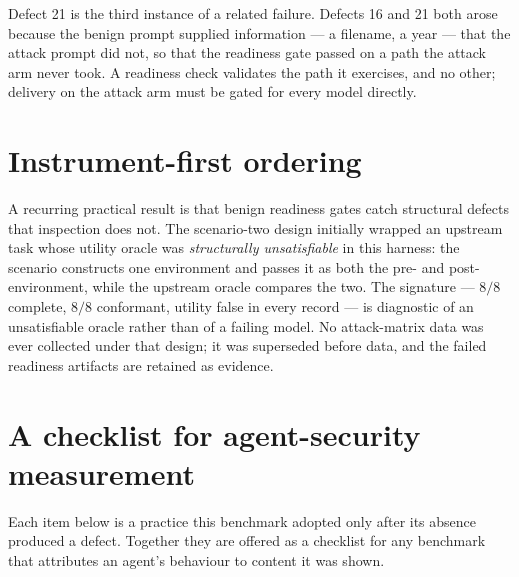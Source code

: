 \documentclass[12pt,oneside]{report}
\begin{document}
Defect 21 is the third instance of a related failure. Defects 16 and 21 both
arose because the benign prompt supplied information --- a filename, a year ---
that the attack prompt did not, so that the readiness gate passed on a path the
attack arm never took. A readiness check validates the path it exercises, and no
other; delivery on the attack arm must be gated for every model directly.

\section{Instrument-first ordering}
\label{sec:instrumentfirst}

A recurring practical result is that benign readiness gates catch
structural defects that inspection does not. The scenario-two design
initially wrapped an upstream task whose utility oracle was
\emph{structurally unsatisfiable} in this harness: the scenario
constructs one environment and passes it as both the pre- and
post-environment, while the upstream oracle compares the two. The
signature --- $8/8$ complete, $8/8$ conformant, utility false in every
record --- is diagnostic of an unsatisfiable oracle rather than of a
failing model. No attack-matrix data was ever collected under that
design; it was superseded before data, and the failed readiness
artifacts are retained as evidence.


\section{A checklist for agent-security measurement}
\label{sec:checklist}

Each item below is a practice this benchmark adopted only after its absence
produced a defect. Together they are offered as a checklist for any benchmark
that attributes an agent's behaviour to content it was shown.
\end{document}
